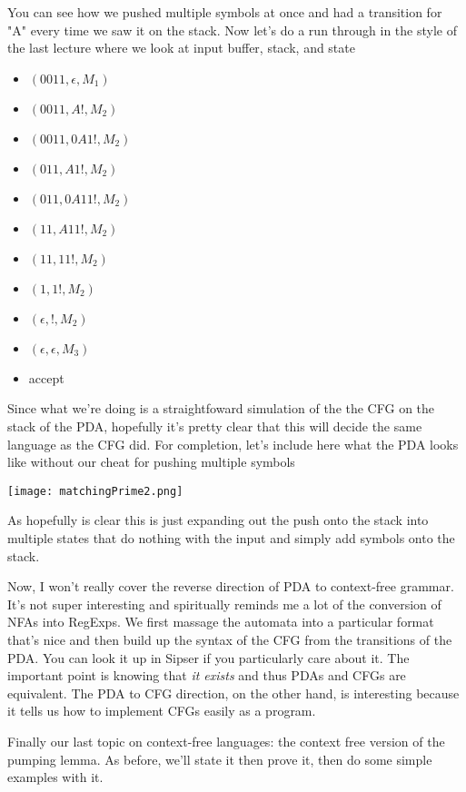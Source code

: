 \documentclass[11pt]{article}
\begin{document}
You can see how we pushed multiple symbols at once and had a transition for "A" every time we saw it on the stack. Now let's do a run through in the style of the last lecture where we look at input buffer, stack, and state

\begin{itemize}
\item $(0011,\epsilon,M_1)$
\item $(0011,A!, M_2)$
\item $(0011,0A1!, M_2)$
\item $(011,A1!, M_2)$
\item $(011,0A11!, M_2)$
\item $(11, A11!, M_2)$
\item $(11, 11!, M_2)$
\item $(1, 1!, M_2)$
\item $(\epsilon, !, M_2)$
\item $(\epsilon, \epsilon, M_3)$
\item accept
\end{itemize}

Since what we're doing is a straightfoward simulation of the the CFG on the stack of the PDA, hopefully it's pretty clear that this will decide the same language as the CFG did. For completion, let's include here what the PDA looks like without our cheat for pushing multiple symbols

\texttt{[image: matchingPrime2.png]}

As hopefully is clear this is just expanding out the push onto the stack into multiple states that do nothing with the input and simply add symbols onto the stack.

Now, I won't really cover the reverse direction of PDA to context-free grammar. It's not super interesting and spiritually reminds me a lot of the conversion of NFAs into RegExps. We first massage the automata into a particular format that's nice and then build up the syntax of the CFG from the transitions of the PDA. You can look it up in Sipser if you particularly care about it. The important point is knowing that \emph{it exists} and thus PDAs and CFGs are equivalent. The PDA to CFG direction, on the other hand, is interesting because it tells us how to implement CFGs easily as a program.

Finally our last topic on context-free languages: the context free version of the pumping lemma. As before, we'll state it then prove it, then do some simple examples with it.
\end{document}
